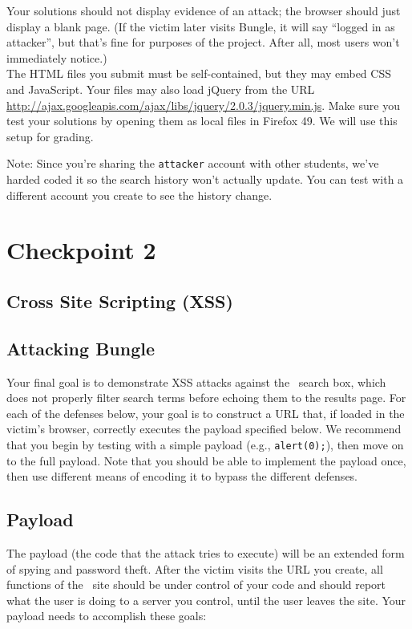 \documentclass[letterpaper,12pt]{report}
\newcommand{\firefox}{Firefox 49}
\newcommand{\jquery}{http://ajax.googleapis.com/ajax/libs/jquery/2.0.3/jquery.min.js}
\begin{document}
Your solutions should not display evidence of an attack; the browser should just display a blank page.  (If the victim later visits Bungle, it will say ``logged in as attacker'', but that's fine for purposes of the project.  After all, most users won't immediately notice.)\\
The HTML files you submit must be self-contained, but they may embed CSS and JavaScript.  Your files may also load jQuery from the URL \url{\jquery}.  Make sure you test your solutions by opening them as local files in \firefox. We will use this setup for grading.

\medskip

Note: Since you're sharing the \texttt{attacker} account with other students, we've harded coded it so the search history won't actually update.  You can test with a different account you create to see the history change.

\pagebreak


\section{Checkpoint 2}
\label{sec:checkpoint_2}


\subsection{Cross Site Scripting (XSS)}
\label{sec:xss}

\subsection*{Attacking Bungle}
Your final goal is to demonstrate XSS attacks against the \bungle\ search box, which does not properly filter search terms before echoing them to the results page.  For each of the defenses below, your goal is to construct a URL that, if loaded in the victim's browser, correctly executes the payload specified below.  We recommend that you begin by testing with a simple payload (e.g., \texttt{alert(0);}), then move on to the full payload.  Note that you should be able to implement the payload once, then use different means of encoding it to bypass the different defenses.

\subsection*{Payload}
The payload (the code that the attack tries to execute) will be an extended form of spying and password theft.  After the victim visits the URL you create, all functions of the \bungle\ site should be under control of your code and should report what the user is doing to a server you control, until the user leaves the site.  Your payload needs to accomplish these goals:
\bigskip
\end{document}
